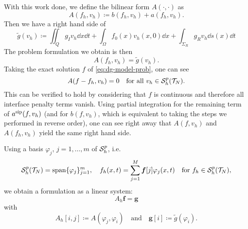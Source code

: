\documentclass[../thesis.tex]{subfiles}
\begin{document}
With this work done, we define the bilinear form $A(\cdot, \cdot)$ as
\[
	A(f_h, v_h) \coloneqq b(f_h, v_h) + a(f_h, v_h).
\]
Then we have a right hand side of
\[
	\tilde{g}(v_h) \coloneqq \iint_Q g_I v_h \dd x \dd t + \int_\Omega f_0(x) v_h(x, 0) \dd x + \int_{\Sigma_R} g_R v_h \dd s(x) \dd t 
\]
The problem formulation we obtain is then
\begin{equation}
\label{eq:dg-discrete-form}
	A(f_h, v_h) = \tilde{g}(v_h).
\end{equation}
Taking the exact solution $f$ of \cref{eq:dg-model-prob}, one can see
\begin{equation}
\label{eq:dg-Galerkin-orthogonality}
	A(f - f_h, v_h) = 0 \quad \text{for all } v_h \in \mathcal{S}_h^p(\mathcal{T}_N).
\end{equation}
This can be verified to hold by considering that $f$ is continuous and therefore all interface penalty terms vanish. Using partial integration for the remaining term of $a^{\mathrm{sip}}(f, v_h)$ (and for $b(f, v_h)$, which is equivalent to taking the steps we performed in reverse order), one can see right away that $A(f, v_h)$ and $A(f_h, v_h)$ yield the same right hand side.

Using a basis $\varphi_j$, $j = 1, \ldots, m$ of $\mathcal{S}_h^p$, i.e.
\[
	\mathcal{S}_h^p(\mathcal{T}_N) = \operatorname*{span} \{ \varphi_j \}_{j=1}^m, \quad f_h(x, t) = \sum_{j=1}^M \boldsymbol{f}[j] \varphi_j(x, t) \quad \text{for } f_h \in \mathcal{S}_h^p(\mathcal{T}_N),
\]
we obtain a formulation as a linear system:
\begin{equation}
\label{eq:dg-discrete-prob}
	A_h \boldsymbol{f} = \boldsymbol{g}
\end{equation}
with
\[
	A_h[i, j] \coloneqq A(\varphi_j, \varphi_i) \quad \text{and} \quad \boldsymbol{g}[i] \coloneqq \tilde{g}(\varphi_i). 
\]
\end{document}
